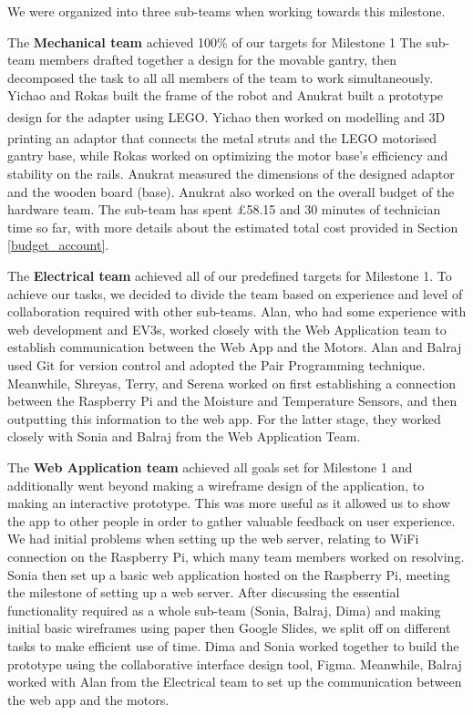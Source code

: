 \documentclass{article}
\begin{document}
We were organized into three sub-teams when working towards this milestone.

The \textbf{Mechanical team} achieved 100\% of our targets for Milestone 1 The sub-team members drafted together a design for the movable gantry, then decomposed the task to all all members of the team to work simultaneously. Yichao and Rokas built the frame of the robot and Anukrat built a prototype design for the adapter using LEGO\textsuperscript{\textregistered}. Yichao then worked on modelling and 3D printing an adaptor that connects the metal struts and the LEGO\textsuperscript{\textregistered} motorised gantry base, while Rokas worked on optimizing the motor base's efficiency and stability on the rails. Anukrat measured the dimensions of the designed adaptor and the wooden board (base). Anukrat also worked on the overall budget of the hardware team. The sub-team has spent £58.15 and 30 minutes of technician time so far, with more details about the estimated total cost provided in Section \ref{budget_account}.



The \textbf{Electrical team} achieved all of our predefined targets for Milestone 1. To achieve our tasks, we decided to divide the team based on experience and level of collaboration required with other sub-teams. Alan, who had some experience with web development and EV3s, worked closely with the Web Application team to establish communication between the Web App and the Motors. Alan and Balraj used Git for version control and adopted the Pair Programming technique. Meanwhile, Shreyas, Terry, and Serena worked on first establishing a connection between the Raspberry Pi and the Moisture and Temperature Sensors, and then outputting this information to the web app. For the latter stage, they worked closely with Sonia and Balraj from the Web Application Team.


The \textbf{Web Application team} achieved all goals set for Milestone 1 and additionally went beyond making a wireframe design of the application, to making an interactive prototype. This was more useful as it allowed us to show the app to other people in order to gather valuable feedback on user experience. We had initial problems when setting up the web server, relating to WiFi connection on the Raspberry Pi, which many team members worked on resolving. Sonia then set up a basic web application hosted on the Raspberry Pi, meeting the milestone of setting up a web server. After discussing the essential functionality required as a whole sub-team (Sonia, Balraj, Dima) and making initial basic wireframes using paper then Google Slides, we split off on different tasks to make efficient use of time. Dima and Sonia worked together to build the prototype using the collaborative interface design tool, Figma. Meanwhile, Balraj worked with Alan from the Electrical team to set up the communication between the web app and the motors. 
\end{document}
